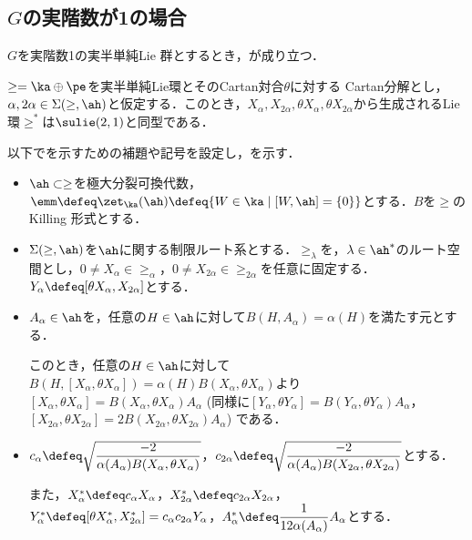 \subsection{$ G$の実階数が1の場合}

\begin{thm}\label{thm:1216-main}
  $G$を実階数1の実半単純Lie 群とするとき，が成り立つ．
\end{thm}

\begin{thm}\label{thm:0810}\cite[p.~409, Theorem~3.1]{hel01}

  $\ge = \ka \oplus \pe$を実半単純Lie環とそのCartan対合$\theta$に対する Cartan分解とし，$\alpha,2\alpha\in \Sigma(\ge,\ah) $と仮定する．このとき，$X_{\alpha},X_{2\alpha}, \theta X_{\alpha}, \theta X_{2\alpha} $から生成されるLie環$\ge^{*} $は$\sulie(2,1)$と同型である．
  
\end{thm}
以下でを示すための補題や記号を設定し，を示す．
\begin{nttdef}
  \leavevmode
  \vspace{-1em}
  \begin{itemize}
  \item $\ah \subset \ge$を極大分裂可換代数，$\emm \defeq \zet_{\ka}(\ah) \defeq \{W\in \ka\mid [W,\ah] = \{0\} \} $とする．$B$を$\ge$のKilling 形式とする．
  \item $\Sigma(\ge,\ah) $を$\ah$に関する制限ルート系とする．$\ge_{\lambda} $を，$\lambda\in \ah^{*}$のルート空間とし，$0\neq X_{\alpha}\in \ge_{\alpha} $，$0\neq X_{2\alpha}\in \ge_{2\alpha} $を任意に固定する．$Y_{\alpha}\defeq [\theta X_{\alpha}, X_{2\alpha}] $とする．
  \item $A_{\alpha}\in \ah $を，任意の$H\in \ah$に対して$B(H,A_{\alpha}) = \alpha(H) $を満たす元とする．
    
    このとき，任意の$H\in \ah$に対して$B(H, [X_{\alpha}, \theta X_{\alpha}]) = \alpha(H) B(X_{\alpha}, \theta X_{\alpha}) $より$[X_{\alpha}, \theta X_{\alpha}] = B(X_{\alpha}, \theta X_{\alpha})A_{\alpha} $ (同様に$[Y_{\alpha}, \theta Y_{\alpha}]  = B(Y_{\alpha}, \theta Y_{\alpha})A_{\alpha} $，$ [X_{2\alpha}, \theta X_{2\alpha}] = 2B(X_{2\alpha}, \theta X_{2\alpha})A_{\alpha} $) である．
    \item $c_{\alpha}\defeq \sqrt{\dfrac{-2}{\alpha(A_{\alpha})B(X_{\alpha}, \theta X_{\alpha})}} $，$ c_{2\alpha}  \defeq \sqrt{\dfrac{-2}{\alpha(A_{\alpha})B(X_{2\alpha}, \theta X_{2\alpha})}} $とする．

    また，$X_{\alpha}^{*}\defeq c_{\alpha}X_{\alpha} $，$X_{2\alpha}^{*}\defeq c_{2\alpha}X_{2\alpha} $，$Y_{\alpha}^{*} \defeq [\theta X_{\alpha}^{*}, X_{2\alpha}^{*} ] = c_{\alpha}c_{2\alpha}Y_{\alpha} $，$A_{\alpha}^{*}\defeq \dfrac{1}{12\alpha(A_{\alpha}) %
    }A_{\alpha} $とする．
  \end{itemize}
\end{nttdef}

